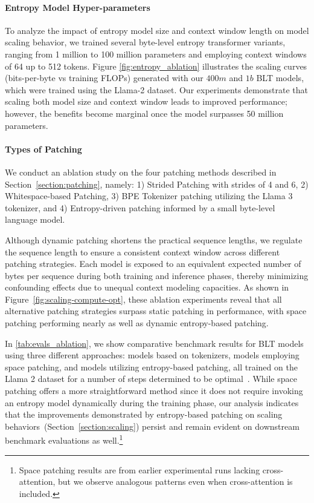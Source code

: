 \paragraph{Entropy Model Hyper-parameters} To analyze the impact of entropy model size and context window length on model scaling behavior, we trained several byte-level entropy transformer variants, ranging from 1 million to 100 million parameters and employing context windows of 64 up to 512 tokens. Figure \autoref{fig:entropy_ablation} illustrates the scaling curves (bits-per-byte vs training FLOPs) generated with our $400m$ and $1b$ {\textsc BLT} models, which were trained using the Llama-2 dataset. Our experiments demonstrate that scaling both model size and context window leads to improved performance; however, the benefits become marginal once the model surpasses 50 million parameters.

\paragraph{Types of Patching}

We conduct an ablation study on the four patching methods described in Section~\ref{section:patching}, namely: 1) Strided Patching with strides of 4 and 6, 2) Whitespace-based Patching, 3) BPE Tokenizer patching utilizing the Llama 3 tokenizer, and 4) Entropy-driven patching informed by a small byte-level language model.

Although dynamic patching shortens the practical sequence lengths, we regulate the sequence length to ensure a consistent context window across different patching strategies. Each model is exposed to an equivalent expected number of bytes per sequence during both training and inference phases, thereby minimizing confounding effects due to unequal context modeling capacities. As shown in Figure~\ref{fig:scaling-compute-opt}, these ablation experiments reveal that all alternative patching strategies surpass static patching in performance, with space patching performing nearly as well as dynamic entropy-based patching.

In \autoref{tab:evals_ablation}, we show comparative benchmark results for {\textsc BLT} models using three different approaches: models based on tokenizers, models employing space patching, and models utilizing entropy-based patching, all trained on the Llama 2 dataset for a number of steps determined to be optimal~\citep{dubey2024llama}. While space patching offers a more straightforward method since it does not require invoking an entropy model dynamically during the training phase, our analysis indicates that the improvements demonstrated by entropy-based patching on scaling behaviors~(Section~\ref{section:scaling}) persist and remain evident on downstream benchmark evaluations as well.\footnote{Space patching results are from earlier experimental runs lacking cross-attention, but we observe analogous patterns even when cross-attention is included.}


